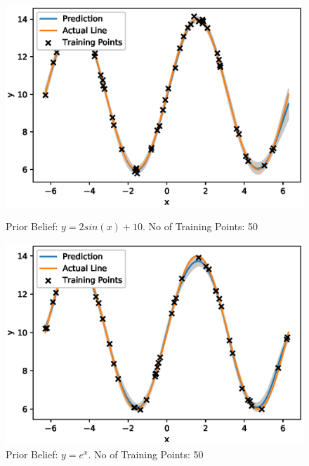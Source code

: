 \begin{figure}[H]
\centering
\begin{minipage}{.5\textwidth}
  \centering
        \includegraphics[width=\textwidth]{images/GP_Explanation/sin_mean_50_training.eps}
        
        \caption{Prior Belief: $y=2sin(x)+10$. No of Training Points: 50}
        \label{fig:gp_plot_y0_50}
\end{minipage}%
\begin{minipage}{.5\textwidth}
  \centering
        \includegraphics[width=\textwidth]{images/GP_Explanation/10_const_mean_50_training.eps}
        \caption{Prior Belief: $y=e^x$. No of Training Points: 50}
        \label{fig:gp_plot_y10_50}
\end{minipage}
\end{figure}




